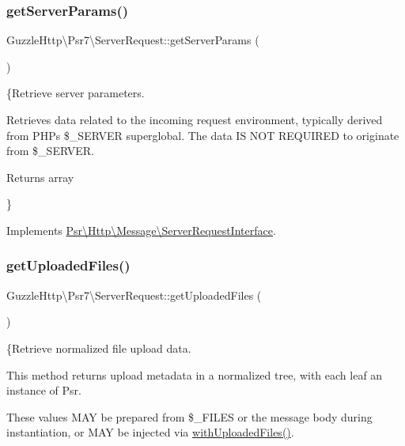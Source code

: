 \subsubsection{\texorpdfstring{get\+Server\+Params()}{getServerParams()}}
{\footnotesize\ttfamily Guzzle\+Http\textbackslash{}\+Psr7\textbackslash{}\+Server\+Request\+::get\+Server\+Params (\begin{DoxyParamCaption}{ }\end{DoxyParamCaption})}

\{Retrieve server parameters.

Retrieves data related to the incoming request environment, typically derived from P\+HP\textquotesingle{}s \$\+\_\+\+S\+E\+R\+V\+ER superglobal. The data IS N\+OT R\+E\+Q\+U\+I\+R\+ED to originate from \$\+\_\+\+S\+E\+R\+V\+ER.

\begin{DoxyReturn}{Returns}
array
\end{DoxyReturn}
\} 

Implements \hyperlink{interfacePsr_1_1Http_1_1Message_1_1ServerRequestInterface_a92fa019aa4ebe9839cf931708548879f}{Psr\textbackslash{}\+Http\textbackslash{}\+Message\textbackslash{}\+Server\+Request\+Interface}.

\mbox{\label{classGuzzleHttp_1_1Psr7_1_1ServerRequest_ae76d19f748d553ee3aa8ec1c719d1efe}} 
\subsubsection{\texorpdfstring{get\+Uploaded\+Files()}{getUploadedFiles()}}
{\footnotesize\ttfamily Guzzle\+Http\textbackslash{}\+Psr7\textbackslash{}\+Server\+Request\+::get\+Uploaded\+Files (\begin{DoxyParamCaption}{ }\end{DoxyParamCaption})}

\{Retrieve normalized file upload data.

This method returns upload metadata in a normalized tree, with each leaf an instance of Psr.

These values M\+AY be prepared from \$\+\_\+\+F\+I\+L\+ES or the message body during instantiation, or M\+AY be injected via \hyperlink{interfacePsr_1_1Http_1_1Message_1_1ServerRequestInterface_aeab9588f1afa2cdccd04671260ecaec8}{with\+Uploaded\+Files()}.

